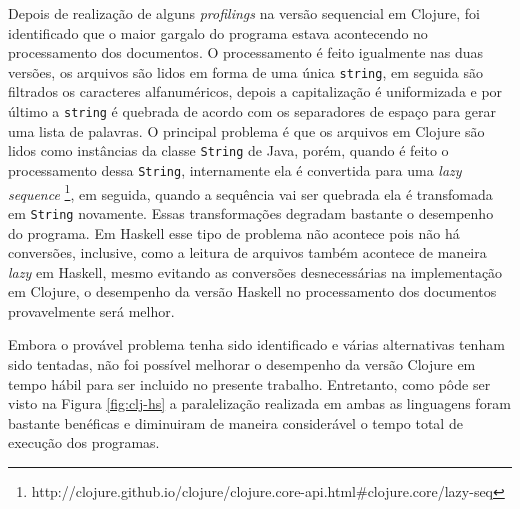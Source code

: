 Depois de realização de alguns \emph{profilings} na versão sequencial em Clojure, foi identificado que o maior gargalo do programa estava acontecendo no processamento dos documentos. O processamento é feito igualmente nas duas versões, os arquivos são lidos em forma de uma única \verb|string|, em seguida são filtrados os caracteres alfanuméricos, depois a capitalização é uniformizada e por último a \verb|string| é quebrada de acordo com os separadores de espaço para gerar uma lista de palavras. O principal problema é que os arquivos em Clojure são lidos como instâncias da classe \verb|String| de Java, porém, quando é feito o processamento dessa \verb|String|, internamente ela é convertida para uma \emph{lazy sequence} \footnote{http://clojure.github.io/clojure/clojure.core-api.html\#clojure.core/lazy-seq}, em seguida, quando a sequência vai ser quebrada ela é transfomada em \verb|String| novamente. Essas transformações degradam bastante o desempenho do programa. Em Haskell esse tipo de problema não acontece pois não há conversões, inclusive, como a leitura de arquivos também acontece de maneira \emph{lazy} em Haskell, mesmo evitando as conversões desnecessárias na implementação em Clojure, o desempenho da versão Haskell no processamento dos documentos provavelmente será melhor.

Embora o provável problema tenha sido identificado e várias alternativas tenham sido tentadas, não foi possível melhorar o desempenho da versão Clojure em tempo hábil para ser incluido no presente trabalho. Entretanto, como pôde ser visto na Figura \ref{fig:clj-hs} a paralelização realizada em ambas as linguagens foram bastante benéficas e diminuiram de maneira considerável o tempo total de execução dos programas.